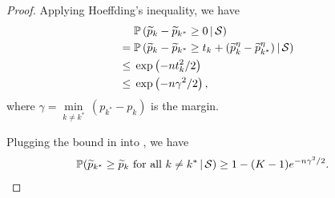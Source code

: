 \documentclass[letterpaper]{article} %
\newcommand{\Em}{{\mathbb{E}}}
\newcommand{\Pm}{{\mathbb{P}}}
\newcommand{\bp}{{\bm{p}}}
\newcommand{\by}{{\bm{y}}}
\newcommand{\be}{{\bm{e}}}
\newcommand{\T}{{\mathsf{T}}}
\newcommand{\gvn}{\,|\,}
\newcommand{\cS}{{\cal{S}}}
\newcommand{\argmax}{\mathrm{argmax}}
\begin{document}
\begin{proof}
    Applying Hoeffding's inequality, we have
    \begin{align}
        &\; \Pm\left( \widetilde{p}_{k} - \widetilde{p}_{k^*} \geq 0 \gvn \cS\right) \\
        =&\; \Pm\left( \widetilde{p}_{k} - \widetilde{p}_{k^*} \geq t_{k} + (\widetilde{p}_{k}^{\eta} - \widetilde{p}_{k^*}^{\eta})
        \gvn \cS \right) \nonumber \\
        \leq&\; \exp\left( -nt_{k}^2/2 \right) \nonumber \\
        \leq&\; \exp\left( -n \gamma^{2}/2 \right), \label{eq:lower}
    \end{align}
    where $\gamma = \underset{k\ne k^*}{\min}\,(p_{k^*} - p_{k})$ is the margin.

    Plugging the bound in  into , we have
    \begin{align*}
        \Pm(\widetilde{p}_{k^*}\geq \widetilde{p}_{k} \text{ for all $k \neq k^{*}$}
        \gvn \cS)
        &\geq 1-(K-1) e^{-n\gamma^2/2}.\qedhere
    \end{align*}





\end{proof}
\end{document}
